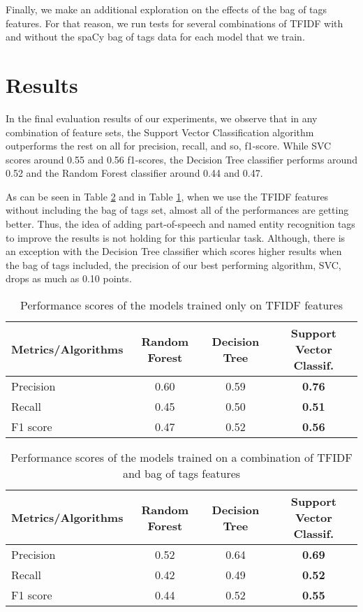\documentclass{article}
\begin{document}
Finally, we make an additional exploration on the effects of the bag of tags features. For that reason, we run tests for several combinations of TFIDF with and without the spaCy bag of tags data for each model that we train.

\section{Results}

In the final evaluation results of our experiments, we observe that in any combination of feature sets, the Support Vector Classification algorithm outperforms the rest on all for precision, recall, and so, f1-score. While SVC scores around 0.55 and 0.56 f1-scores, the Decision Tree classifier performs around 0.52 and the Random Forest classifier around 0.44 and 0.47. 

As can be seen in Table \ref{full-set} and in Table \ref{only-tfidf}, when we use the TFIDF features without including the bag of tags set, almost all of the performances are getting better. Thus, the idea of adding part-of-speech and named entity recognition tags to improve the results is not holding for this particular task. Although, there is an exception with the Decision Tree classifier which scores higher results when the bag of tags included, the precision of our best performing algorithm, SVC, drops as much as 0.10 points.

\begin{table}[h]
\centering
\begin{tabular}{| l | c | c | c |}
\hline
Metrics/Algorithms & Random Forest & Decision Tree	& Support Vector Classif. \\
\hline
Precision & 0.60	& 0.59 & \textbf{0.76} 	\\
\hline
Recall	& 0.45	&  0.50 & \textbf{0.51} \\
\hline
F1 score & 0.47 & 0.52 & \textbf{0.56} \\
\hline
\end{tabular}
\caption{Performance scores of the models trained only on TFIDF features}
\label{only-tfidf}
\end{table}

\begin{table}[h]
\centering
\begin{tabular}{| l | c | c | c |}
\hline
Metrics/Algorithms & Random Forest & Decision Tree	& Support Vector Classif. \\
\hline
Precision	& 0.52	& 0.64 & \textbf{0.69} \\
\hline
Recall	& 0.42	&  0.49 & \textbf{0.52} \\
\hline
F1 score & 0.44 & 0.52 & \textbf{0.55} \\
\hline
\end{tabular}
\caption{Performance scores of the models trained on a combination of TFIDF and bag of tags features}
\label{full-set}
\end{table}
\end{document}
